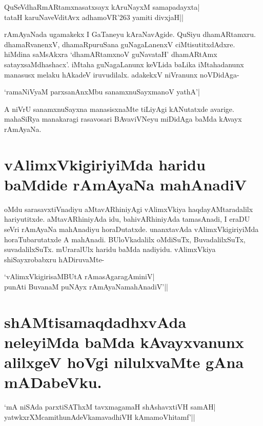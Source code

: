 \begin{shloka} 
QuSeVdhaRmARtamxnasatxsayx kAruNayxM samapadayxta|\label{165d}\\ 
tataH karuNaveVditAvx adhamoVR\char'263 yamiti divxjaH||
\end{shloka} 

rAmAyaNada ugamakekx I GaTaneyu kAraNavAgide. QuSiyu dhamARtamxru. dhamaRvanenxV, dhamaRpuruSana guNagaLanenxV ciMtisutitxdAdxre. hiMdina saMsAkxra `dhamARtamxnoV guNavataH'\label{165a} dhamARtAmx satayxsaMdhashacx'.\label{165b} iMtaha guNagaLanunx keVLida baLika iMtahadanunx manasusx melaku hAkadeV iruvudilalx. adakekxV niVranunx noVDidAga- 

\begin{shloka} 
`ramaNiVyaM parxsanAnxMbu sanamxnuSayxmanoV yathA'|\label{165c}
\end{shloka} 

A niVrU sanamxnuSayxna manasisxnaMte tiLiyAgi kANutatxde avarige. mahaSiRya manakaragi rasavosari BAvaviVNeyu miDidAga baMda kAvayx rAmAyaNa. 

\section*{vAlimxVkigiriyiMda haridu baMdide rAmAyaNa mahAnadiV} 

oMdu sarasavxtiVnadiyu aMtavARhiniyAgi vAlimxVkiya haqdayAMtaradalilx hariyutitxde. aMtavARhiniyAda idu, bahivARhiniyAda tamasAnadi, I eraDU seVri rAmAyaNa mahAnadiyu horaDutatxde. unanxtavAda vAlimxVkigiriyiMda horaTubarutatxde A mahAnadi. BUloVkadalilx oMdiSuTx, BuvadalilxSuTx, suvadalilxSuTx. mUraralUlx haridu baMda nadiyidu. vAlimxVkiya shiSayxrobabxru hADiruvaMte- 

\begin{shloka} 
`vAlimxVkigirisaMBUtA rAmasAgaragAminiV|\label{166b}\\ 
punAti BuvanaM puNAyx rAmAyaNamahAnadiV'||
\end{shloka} 

\section*{shAMtisamaqdadhxvAda neleyiMda baMda kAvayxvanunx alilxgeV hoVgi nilulxvaMte gAna mADabeVku.} 

\begin{shloka} 
`mA niSAda parxtiSAThxM tavxmagamaH shAshavxtiVH samAH|\label{166}\\ 
yatwkxrXMcamithunAdeVkamavadhiVH kAmamoVhitamf'|| 
\end{shloka} 

